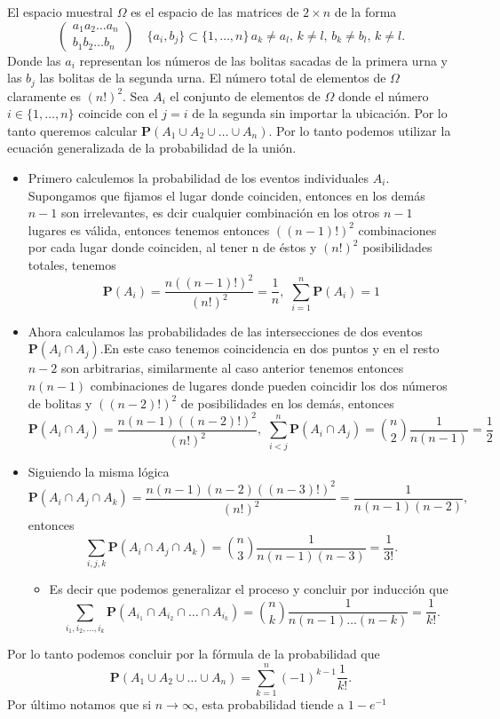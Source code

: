 \documentclass[letterpaper]{book}
\newcommand{\prob}{\textbf{P}}
\newcommand{\om}{\ensuremath{\Omega}}
\begin{document}
\noindent El espacio muestral \(\om\) es el espacio de las matrices de \(2\times n\) de la forma
\begin{equation}
\begin{pmatrix}
a_1 a_2\dots a_n\\
b_1 b_2\dots b_n
\end{pmatrix}
\quad \{a_i,b_j\}\subset\{1,\dots,n\}\,a_k\neq a_l,\,k\neq l,\,b_k\neq b_l,\,k\neq l.
\end{equation}
\noindent Donde las \(a_i\) representan los números de las bolitas sacadas de la primera urna y las \(b_j\) las bolitas de la segunda urna. El número total de elementos de \(\om\) claramente es \((n!)^2\). Sea \(A_i\) el conjunto de elementos de \(\om\) donde el número \(i\in\{1,\dots,n\}\) coincide con el \(j=i\) de la segunda sin importar la ubicación. Por lo tanto queremos calcular \(\prob(A_1\cup A_2\cup\dots\cup A_n)\). Por lo tanto podemos utilizar la ecuación generalizada de la probabilidad de la unión.
\begin{itemize}
\item Primero calculemos la probabilidad de los eventos individuales \(A_i\). Supongamos que fijamos el lugar donde coinciden, entonces en los demás \(n-1\) son irrelevantes, es dcir cualquier combinación en los otros \(n-1\) lugares es válida, entonces tenemos entonces \(((n-1)!)^2\) combinaciones por cada lugar donde coinciden, al tener n de éstos y \((n!)^2\) posibilidades totales, tenemos
\[
  \prob(A_i)=\frac{n((n-1)!)^2}{(n!)^2}=\frac{1}{n},\,\,\sum_{i=1}^n \prob(A_i)=1
  \]
\item Ahora calculamos las probabilidades de las intersecciones de dos eventos \(\prob(A_i\cap A_j)\).En este caso tenemos coincidencia en dos puntos y en el resto \(n-2\) son arbitrarias, similarmente al caso anterior tenemos entonces \(n(n-1)\) combinaciones de lugares donde pueden coincidir los dos números de bolitas y \(((n-2)!)^2\) de posibilidades en los demás, entonces 
\[
  \prob(A_i\cap A_j)=\frac{n(n-1)((n-2)!)^2}{(n!)^2},\,\,\sum_{i<j}^n \prob(A_i\cap A_j)={n\choose2}\frac{1}{n(n-1)}=\frac{1}{2}
  \]
\item Siguiendo la misma lógica 
\[
  \prob(A_i\cap A_j\cap A_k)=\frac{n(n-1)(n-2)((n-3)!)^2}{(n!)^2}=\frac{1}{n(n-1)(n-2)},
  \]
entonces
\[
  \sum_{i,j,k}\prob(A_i\cap A_j\cap A_k)={n\choose3}\frac{1}{n(n-1)(n-3)}=\frac{1}{3!}.
  \]
\begin{itemize}
\item Es decir que podemos generalizar el proceso y concluir por inducción que
\[
  \sum_{i_1,i_2,\dots,i_k}\prob(A_{i_1}\cap A_{i_2}\cap\dots\cap A_{i_k})={n\choose k}\frac{1}{n(n-1)\dots(n-k)}=\frac{1}{k!}.
  \]
\end{itemize}
\end{itemize}
\noindent Por lo tanto podemos concluir por la fórmula de la probabilidad que
\[
  \prob(A_1\cup A_2\cup\dots\cup A_n)=\sum_{k=1}^n (-1)^{k-1}\frac{1}{k!}.
\]
Por último notamos que si \(n\rightarrow\infty\), esta probabilidad tiende a \(1-e^{-1}\)
\end{document}
